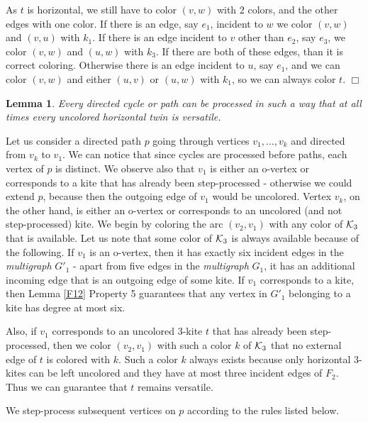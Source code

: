 \documentclass[a4, 11pt]{article}
\newcommand{\dowod}{\noindent{\bf Proof.~}}
\newcommand{\koniec}{\hfill $\Box$\\[.1ex]}
\newcommand{\<}{\langle}
\renewcommand{\>}{\rangle}
\newcommand{\Kt}{{\cal K}_3}
\newtheorem{lemma}{Lemma}
\begin{document}
As $t$ is horizontal, we still have to color $(v,w)$ with $2$ colors, and the other edges with one color. If there is an edge, say $e_1$, incident to $w$ we color $(v,w)$ and $(v,u)$ with $k_1$. If there is an  edge incident to $v$ other than $e_2$, say $e_3$, we color $(v,w)$ and $(u,w)$ with $k_3$. If there are both of these edges, than it is correct coloring. Otherwise there is an edge incident to $u$, say $e_1$, and we can color $(v,w)$ and either $(u,v)$ or $(u,w)$ with $k_1$, so we can always color $t$. \koniec
 



\begin{lemma} Every  directed cycle or path can be processed in such a way that at all times every uncolored horizontal twin is versatile.
\end{lemma} 
\dowod
Let us consider a directed path $p$ going through vertices $v_1, \ldots, v_k$ and directed from $v_k$ to $v_1$. 
We can notice that since cycles are processed before paths, each vertex of $p$ is distinct.
We observe also that $v_1$ is either an o-vertex or corresponds to a kite that has already been step-processed - otherwise we could extend $p$, because then the outgoing edge of $v_1$ would be uncolored.  Vertex $v_k$, on the other hand, is either an o-vertex or corresponds to an uncolored (and not step-processed) kite. We begin by  coloring the arc $(v_2, v_1)$ with any color of $\Kt$ that is available. 
Let us note that some color of $\Kt$ is always available because of the following.  If $v_1$ is an o-vertex, then it has exactly six incident edges in the {\em multigraph} $G'_1$ - apart from five edges in the {\em multigraph} $G_1$, it  has an additional incoming edge that is an outgoing edge of some kite. If $v_1$ corresponds to a kite, then  Lemma \ref{F12} Property 5 guarantees that any vertex in $G'_1$ belonging to a kite has degree at most six.

 Also, if $v_1$ corresponds to an uncolored $3$-kite $t$ that has already been step-processed, then we color $(v_2, v_1)$ with such a color $k$ of $\Kt$ that no external edge of $t$ is colored with $k$.  Such a color $k$ always exists because only horizontal $3$-kites can be left uncolored and they have at most three incident edges of $F_2$. Thus we can guarantee that $t$ remains versatile.

We step-process subsequent vertices on $p$ according to the rules listed below. 
 
\end{document}
